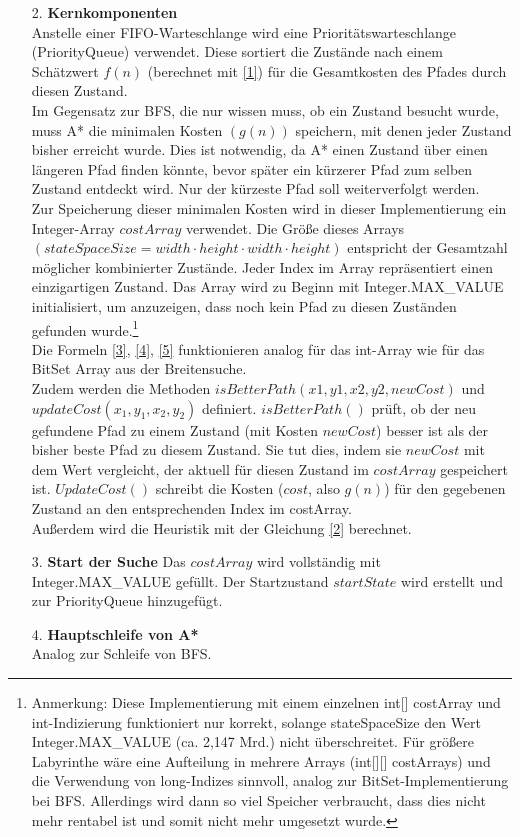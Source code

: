 \documentclass[a4paper,10pt,ngerman]{scrartcl}
\begin{document}
\begin{enumerate}
  \item [2.] \textbf{Kernkomponenten}\\
      Anstelle einer FIFO-Warteschlange wird eine Prioritätswarteschlange (PriorityQueue) verwendet. Diese sortiert die Zustände nach einem Schätzwert $f(n)$ (berechnet mit \ref{1}) für die Gesamtkosten des Pfades durch diesen Zustand. \\
          Im Gegensatz zur BFS, die nur wissen muss, ob ein Zustand besucht wurde, muss A* die minimalen Kosten $(g(n))$ speichern, mit denen jeder Zustand bisher erreicht wurde. Dies ist notwendig, da A* einen Zustand über einen längeren Pfad finden könnte, bevor später ein kürzerer Pfad zum selben Zustand entdeckt wird. Nur der kürzeste Pfad soll weiterverfolgt werden. \\
      Zur Speicherung dieser minimalen Kosten wird in dieser Implementierung ein Integer-Array $costArray$ verwendet. Die Größe dieses Arrays $(stateSpaceSize = width \cdot height \cdot width \cdot height)$ entspricht der Gesamtzahl möglicher kombinierter Zustände. Jeder Index im Array repräsentiert einen einzigartigen Zustand. Das Array wird zu Beginn mit Integer.MAX\_VALUE initialisiert, um anzuzeigen, dass noch kein Pfad zu diesen Zuständen gefunden wurde.\footnote{Anmerkung: Diese Implementierung mit einem einzelnen int[] costArray und int-Indizierung funktioniert nur korrekt, solange stateSpaceSize den Wert Integer.MAX\_VALUE (ca. 2,147 Mrd.) nicht überschreitet. Für größere Labyrinthe wäre eine Aufteilung in mehrere Arrays (int[][] costArrays) und die Verwendung von long-Indizes sinnvoll, analog zur BitSet-Implementierung bei BFS. Allerdings wird dann so viel Speicher verbraucht, dass dies nicht mehr rentabel ist und somit nicht mehr umgesetzt wurde.} 
    \\
    Die Formeln \ref{3}, \ref{4}, \ref{5} funktionieren analog für das int-Array wie für das BitSet Array aus der Breitensuche. \\
    Zudem werden die Methoden $isBetterPath(x1, y1, x2, y2, newCost)$ und $updateCost(x_1, y_1, x_2, y_2)$ definiert. $isBetterPath()$ prüft, ob der neu gefundene Pfad zu einem Zustand (mit Kosten $newCost$) besser ist als der bisher beste Pfad zu diesem Zustand. Sie tut dies, indem sie $newCost$ mit dem Wert vergleicht, der aktuell für diesen Zustand im $costArray$ gespeichert ist. $UpdateCost()$ schreibt die Kosten ($cost$, also $g(n)$) für den gegebenen Zustand an den entsprechenden Index im costArray. \\
    Außerdem wird die Heuristik mit der Gleichung \ref{2} berechnet. 
  \item[3.] \textbf{Start der Suche}
      Das $costArray$ wird vollständig mit Integer.MAX\_VALUE gefüllt. Der Start\-zustand $startState$ wird erstellt und zur PriorityQueue hinzugefügt. 
  \item[4.] \textbf{Hauptschleife von A*}\\
  Analog zur Schleife von BFS.
\end{enumerate}
\end{document}
